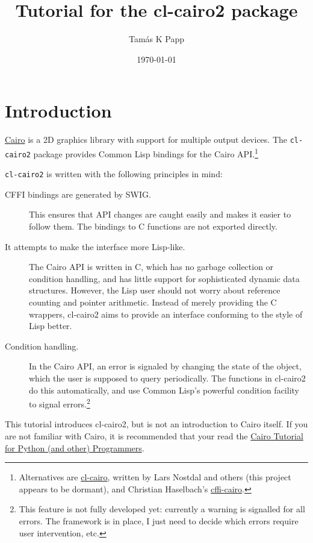 \documentclass[12pt,letterpaper,dvipdfm]{article}
\begin{document}
\title{Tutorial for the cl-cairo2 package}
\author{Tam\'as K Papp}
\date{\today}
\maketitle

\section{Introduction}
\label{sec:introduction}

\href{http://cairographics.org/}{Cairo} is a 2D graphics library with
support for multiple output devices.  The \lstinline!cl-cairo2!
package provides Common Lisp bindings for the Cairo API.\footnote{Alternatives
are \href{http://www.cliki.net/cl-cairo}{cl-cairo}, written by Lars
Nostdal and others (this project appears to be dormant), and Christian
Haselbach's \href{http://www.cliki.net/cffi-cairo}{cffi-cairo}.}

\lstinline!cl-cairo2! is written with the following principles in mind:

\begin{description}
\item[CFFI bindings are generated by SWIG.]  This ensures that API
  changes are caught easily and makes it easier to follow them.
  The bindings to C functions are not exported directly.
\item[It attempts to make the interface more Lisp-like.]  The Cairo
  API is written in C, which has no garbage collection or condition
  handling, and has little support for sophisticated dynamic data
  structures.  However, the Lisp user should not worry about reference
  counting and pointer arithmetic.  Instead of merely providing the C
  wrappers, cl-cairo2 aims to provide an interface conforming to the
  style of Lisp better.
\item[Condition handling.]  In the Cairo API, an error is signaled by
  changing the state of the object, which the user is supposed to
  query periodically.  The functions in cl-cairo2 do this
  automatically, and use Common Lisp's powerful condition facility to
  signal errors.\footnote{This feature is not fully developed yet:
    currently a warning is signalled for all errors.  The framework is
    in place, I just need to decide which errors require user
    intervention, etc.}
\end{description}

This tutorial introduces cl-cairo2, but is not an introduction to
Cairo itself.  If you are not familiar with Cairo, it is recommended
that your read the
\href{http://www.tortall.net/mu/wiki/CairoTutorial}{Cairo Tutorial for
  Python (and other) Programmers}.
\end{document}
